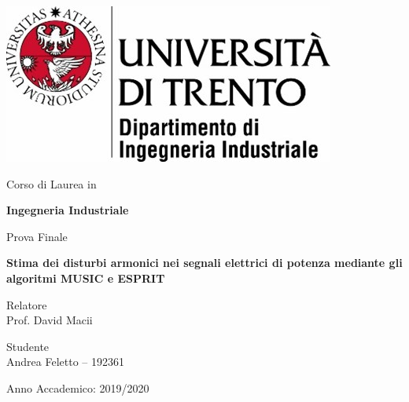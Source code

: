 \begin{titlepage}

    \includegraphics{assets/university-logo.jpg}
    
    \begin{center}
        \vspace{1.5cm}
        \LARGE
        Corso di Laurea in
        
        \vspace{0.2cm}
        \LARGE
        \textbf{Ingegneria Industriale}
        
        \vspace{1.5cm}
        \LARGE
        Prova Finale
        
        \vspace{0.2cm}
        \LARGE
        \textbf{Stima dei disturbi armonici nei segnali elettrici di potenza
        mediante gli algoritmi MUSIC e ESPRIT}
    \end{center}
    
    \vfill
    
    \Large{}\noindent
    Relatore \\
    Prof. David Macii
    
    \vspace{0.6cm}
    \Large{}\noindent
    Studente \\
    Andrea Feletto -- 192361
    
    \vspace{1.2cm}
    \begin{center}
        \large
        Anno Accademico: 2019/2020
    \end{center}
    
\end{titlepage}
